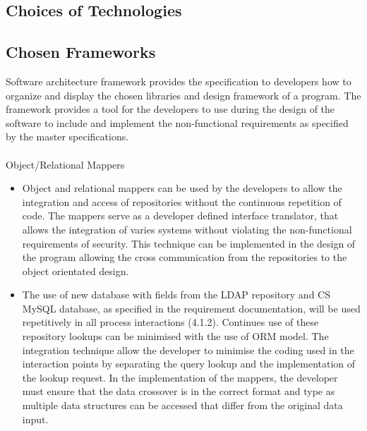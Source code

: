 \documentclass[12pt]{article}
\begin{document}
		\subsection{Choices of Technologies}
			\vspace{0.2in}
		
		
		\subsection{Chosen Frameworks}
				
							 Software architecture framework provides the specification to developers how to organize and display the chosen libraries and design framework of a program. The framework provides a tool for the developers to use during the design of the software to include and implement the non-functional requirements as specified by the master specifications.
							\\
							\\ Object/Relational Mappers
							\begin{itemize}
								 \item Object and relational mappers can be used by the developers to allow the integration and access of repositories without the continuous repetition of code. The mappers serve as a developer defined interface translator, that allows the integration of varies systems without violating the non-functional requirements of security. This technique can be implemented in the design of the program allowing the cross communication from the repositories to the object orientated design. 
								
								\item The use of new database with fields from the LDAP repository and CS MySQL database, as specified in the requirement documentation, will be used repetitively in all process interactions (4.1.2). Continues use of these repository lookups can be minimised with the use of ORM model. The integration technique allow the developer to minimise the coding used in the interaction points by separating the query lookup and the implementation of the lookup request. In the implementation of the mappers, the developer must ensure that the data crossover is in the correct format and type as multiple data structures can be accessed that differ from the original data input.
							\end{itemize}
\end{document}
